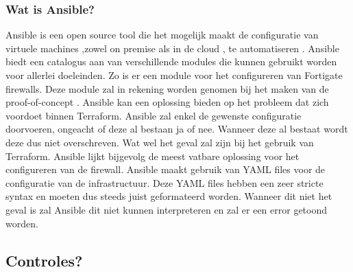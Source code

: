 \subsubsection{Wat is Ansible?}
Ansible is een open source tool die het mogelijk maakt de configuratie van virtuele machines ,zowel on premise als in de cloud , te automatiseren \autocite{Hat}. Ansible biedt een catalogus aan van verschillende modules die kunnen gebruikt worden voor allerlei doeleinden. Zo is er een module voor het configureren van Fortigate firewalls. Deze module zal in rekening worden genomen bij het maken van de proof-of-concept \autocite{Fortinet2020}. Ansible kan een oplossing bieden op het probleem dat zich voordoet binnen Terraform. Ansible zal enkel de gewenste configuratie doorvoeren, ongeacht of deze al bestaan ja of nee. Wanneer deze al bestaat wordt deze dus niet overschreven. Wat wel het geval zal zijn bij het gebruik van Terraform. Ansible lijkt bijgevolg de meest vatbare oplossing voor het configureren van de firewall. Ansible maakt gebruik van YAML files voor de configuratie van de infrastructuur. Deze YAML files hebben een zeer stricte syntax en moeten dus steeds juist geformateerd worden. Wanneer dit niet het geval is zal Ansible dit niet kunnen interpreteren en zal er een error getoond worden.

\subsection{Controles?}

